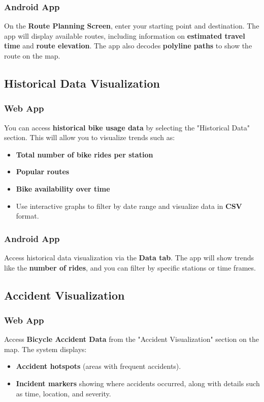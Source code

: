 \documentclass[12pt]{article}
\begin{document}
\subsubsection*{Android App}
On the \textbf{Route Planning Screen}, enter your starting point and destination. The app will display available routes, including information on \textbf{estimated travel time} and \textbf{route elevation}. The app also decodes \textbf{polyline paths} to show the route on the map.

\subsection{Historical Data Visualization}
\subsubsection*{Web App}
You can access \textbf{historical bike usage data} by selecting the "Historical Data" section. This will allow you to visualize trends such as:
\begin{itemize}
    \item \textbf{Total number of bike rides per station}
    \item \textbf{Popular routes}
    \item \textbf{Bike availability over time}
    \item Use interactive graphs to filter by date range and visualize data in \textbf{CSV} format.
\end{itemize}

\subsubsection*{Android App}
Access historical data visualization via the \textbf{Data tab}. The app will show trends like the \textbf{number of rides}, and you can filter by specific stations or time frames.

\subsection{Accident Visualization}
\subsubsection*{Web App}
Access \textbf{Bicycle Accident Data} from the "Accident Visualization" section on the map. The system displays:
\begin{itemize}
    \item \textbf{Accident hotspots} (areas with frequent accidents).
    \item \textbf{Incident markers} showing where accidents occurred, along with details such as time, location, and severity.
\end{itemize}
\end{document}
